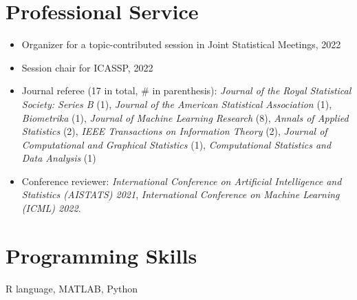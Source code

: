 \documentclass[letterpaper,11pt]{article}
\begin{document}
	\section{Professional Service}
	\begin{itemize}
		\item Organizer for a topic-contributed session in Joint Statistical Meetings, 2022\\
		\item Session chair for ICASSP, 2022\\
		\item Journal referee (17 in total, \# in parenthesis): {\em Journal of the Royal Statistical Society: Series B} (1), {\em Journal of the American Statistical Association} (1), {\em Biometrika} (1), {\em Journal of Machine Learning Research} (8), {\em Annals of Applied Statistics} (2), {\em IEEE Transactions on Information Theory} (2), {\em Journal of Computational and Graphical Statistics} (1), {\em Computational Statistics and Data Analysis} (1)
		\item Conference reviewer: {\em International Conference on Artificial Intelligence and Statistics (AISTATS) 2021}, {\em International Conference on Machine Learning (ICML) 2022}.
	\end{itemize}
	\section{Programming Skills}
	 R language,  MATLAB, Python
\begin{comment}
	\section{References}
\begin{tabular}{lr}
	\begin{minipage}[t]{2.5in}
		Prof.\ Genevera I. Allen\\
		Rice University\\
		Location B\\
		Country and Postcode\\
		\Telefon\ +00 1 234 5678\\
		\Letter\ \href{mailto:X@A.ac.jp}{X\textrm{@}A.ac.jp}
	\end{minipage}
	&
	\begin{minipage}[t]{2.5in}
		Prof.\ X Y\\
		Place A\\
		Location B\\
		Country and Postcode\\
		\Telefon\ +00 1 234 5678\\
		\Letter\ \href{mailto:X@A.ac.jp}{X\textrm{@}A.ac.jp}
	\end{minipage}
\end{tabular}
\end{comment}
\end{document}
